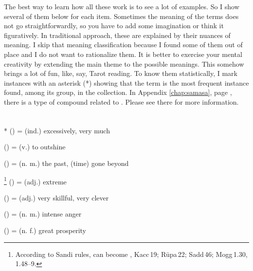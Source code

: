 The best way to learn how all these work is to see a lot of examples. So I show several of them below for each item. Sometimes the meaning of the terms does not go straightforwardly, so you have to add some imagination or think it figuratively. In traditional approach, these are explained by their nuances of meaning. I skip that meaning classification because I found some of them out of place and I do not want to rationalize them. It is better to exercise your mental creativity by extending the main theme to the possible meanings. This somehow brings a lot of fun, like, say, Tarot reading. To know them statistically, I mark instances with an asterisk (*) showing that the term is the most frequent instance found, among its group, in the collection. In Appendix \ref{chap:samasa}, page \pageref{sec:abyayi}, there is a type of compound related to . Please see there for more information.

\section*{}\label{upasagga:ati}
\begin{compactitem}
\item {}* () = (ind.) excessively, very much
\item {} () = (v.) to outshine
\item {} () = (n. m.) the past, (time) gone beyond
\item {}\footnote{According to Sandi rules,  can become , Kacc\,19; R\=upa\,22; Sadd\,46; Mogg\,1.30, 1.48--9.} () = (adj.) extreme
\item {} () = (adj.) very skillful, very clever
\item {} () = (n. m.) intense anger
\item {} () = (n. f.) great prosperity
\end{compactitem}

